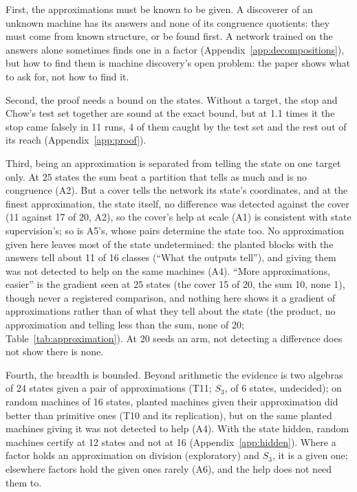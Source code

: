 \documentclass[11pt]{article}
\newcommand{\pn}[2]{#2}
\begin{document}
First, the approximations must be known to be given. A discoverer of an unknown machine has its
answers and none of its congruence quotients: they must come from known structure, or be found first. A network
trained on the answers alone sometimes finds one in a factor (Appendix~\ref{app:decompositions}),
but how to find them is machine discovery's open problem: the paper shows what to ask for, not how
to find it.

Second, the proof needs a bound on the states. Without a target, the stop and Chow's test set
together are sound at the exact bound, but at 1.1 times it the stop came falsely in
\pn{k9.slack-false}{11} runs, \pn{k9.slack-refuted}{4} of them caught by the test set and the rest
out of its reach (Appendix~\ref{app:proof}).

Third, being an approximation is separated from telling the state on one target only. At 25 states
the sum beat a partition that tells as much and is no congruence (A2). But a cover tells the network
its state's coordinates, and at the finest approximation, the state itself, no difference was
detected against the cover (\pn{t12.cover}{11} against \pn{t12.state}{17} of 20, A2), so the cover's
help at scale (A1) is consistent with state supervision's; so is A5's, whose pairs determine the
state too. No approximation given here leaves most of the state undetermined: the planted blocks
with the answers tell about 11 of 16 classes (``What the outputs tell''), and giving them was not
detected to help on the same machines (A4). ``More approximations, easier'' is
the gradient seen at 25 states (the cover \pn{k4.claim-cover}{15} of 20, the sum
\pn{k5.claim-sum}{10}, none \pn{k4.claim-quotient}{1}), though never a registered comparison, and
nothing here shows it a gradient of approximations rather than of what they tell about the state (the
product, no approximation and telling less than the sum, none of 20;
Table~\ref{tab:approximation}). At 20 seeds an arm, not detecting a difference does not show there
is none.

Fourth, the breadth is bounded. Beyond arithmetic the evidence is two algebras of 24 states given a
pair of approximations (T11; $S_3$, of 6 states, undecided); on random machines of 16 states, planted
machines given their approximation did better than primitive ones (T10 and its replication), but on
the same planted machines giving it was not detected to help (A4). With the state hidden, random machines
certify at 12 states and not at 16 (Appendix~\ref{app:hidden}). Where a factor holds an approximation on division (exploratory) and $S_3$, it is a given one;
elsewhere factors hold the given ones rarely (A6), and the help does not need them to.
\end{document}

